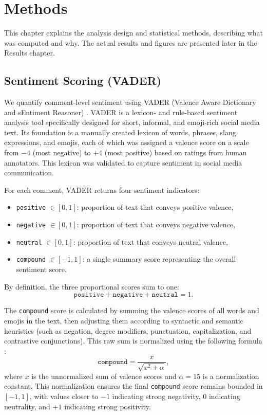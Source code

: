 
\cleardoubleoddpage%

\chapter{Methods}
\label{sec:methods}
This chapter explains the analysis design and statistical methods, describing what was computed and why. The actual results and figures are presented later in the Results chapter.

\section{Sentiment Scoring (VADER)}
\label{subsec:vader}

We quantify comment-level sentiment using VADER (Valence Aware Dictionary and sEntiment Reasoner) \cite{hutto2014vader}. 
VADER is a lexicon- and rule-based sentiment analysis tool specifically designed for short, informal, 
and emoji-rich social media text. Its foundation is a manually created lexicon of words, phrases, 
slang expressions, and emojis, each of which was assigned a valence score on a scale from $-4$ 
(most negative) to $+4$ (most positive) based on ratings from human annotators. 
This lexicon was validated to capture sentiment in social media communication.

For each comment, VADER returns four sentiment indicators:

\begin{itemize}
    \item \texttt{positive} $\in [0,1]$: proportion of text that conveys positive valence,
    \item \texttt{negative} $\in [0,1]$: proportion of text that conveys negative valence,
    \item \texttt{neutral} $\in [0,1]$: proportion of text that conveys neutral valence,
    \item \texttt{compound} $\in [-1,1]$: a single summary score representing the overall sentiment score.
\end{itemize}

By definition, the three proportional scores sum to one:
\[
\texttt{positive} + \texttt{negative} + \texttt{neutral} = 1.
\]

The \texttt{compound} score is calculated by summing the valence scores of all words and emojis in the text, 
then adjusting them according to syntactic and semantic heuristics (such as negation, degree modifiers, 
punctuation, capitalization, and contrastive conjunctions). This raw sum is normalized using the following formula \cite{hutto2014vader}:
\[
\texttt{compound} = \frac{x}{\sqrt{x^2 + \alpha}},
\]
where $x$ is the unnormalized sum of valence scores and $\alpha = 15$ is a normalization constant. 
This normalization ensures the final \texttt{compound} score remains bounded in $[-1,1]$, with 
values closer to $-1$ indicating strong negativity, $0$ indicating neutrality, and $+1$ indicating strong positivity.

